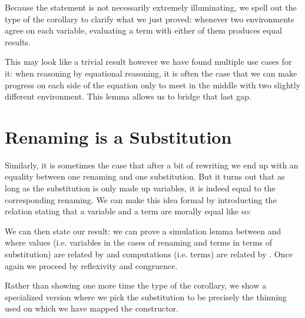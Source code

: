
Because the  statement is not necessarily extremely illuminating, we spell
out the type of the corollary to clarify what we just proved: whenever two environments
agree on each variable, evaluating a term with either of them produces equal results.


This may look like a trivial result however we have found multiple use cases for it:
when reasoning by equational reasoning, it is often the case that we can make progress
on each side of the equation only to meet in the middle with two slightly different
environment. This lemma allows us to bridge that last gap.

\section{Renaming is a Substitution}

Similarly, it is sometimes the case that after a bit of rewriting we end up with an
equality between one renaming and one substitution. But it turns out that as long as
the substitution is only made up variables, it is indeed equal to the corresponding
renaming. We can make this idea formal by introducting the  relation
stating that a variable and a term are morally equal like so:


We can then state our result: we can prove a simulation lemma between 
and  where values (i.e. variables in the cases of renaming and terms
in terms of substitution) are related by  and computations (i.e. terms)
are related by . Once again we proceed by reflexivity and congruence.


Rather than showing one more time the type of the corollary, we show a specialized
version where we pick the substitution to be precisely the thinning used on which we
have mapped the  constructor.




